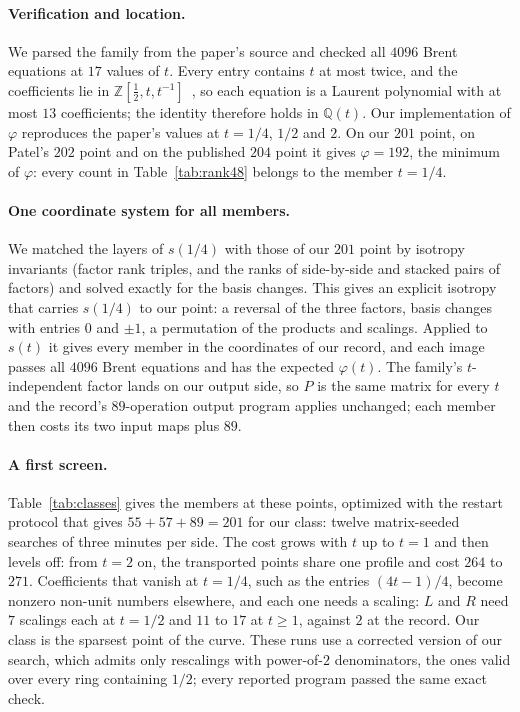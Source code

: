 \documentclass[11pt]{article}
\theoremstyle{remark}
\newcommand{\Q}{\mathbb{Q}}
\newcommand{\Z}{\mathbb{Z}}
\begin{document}
\paragraph{Verification and location.}  We parsed the family from the
paper's source and checked all $4096$ Brent equations at $17$ values of
$t$.  Every entry contains $t$ at most twice, and the coefficients lie in
$\Z[\frac12,t,t^{-1}]$~\cite{Agarwal26}, so each equation is a Laurent
polynomial with at most $13$ coefficients; the identity therefore holds
in $\Q(t)$.  Our implementation of $\varphi$ reproduces the paper's
values at $t=1/4$, $1/2$ and $2$.  On our $201$ point, on Patel's $202$
point and on the published $204$ point it gives $\varphi=192$, the
minimum of $\varphi$: every count in Table~\ref{tab:rank48} belongs to
the member $t=1/4$.

\paragraph{One coordinate system for all members.}  We matched the
layers of $s(1/4)$ with those of our $201$ point by isotropy invariants
(factor rank triples, and the ranks of side-by-side and stacked pairs of
factors) and solved exactly for the basis changes.  This gives an
explicit isotropy that carries $s(1/4)$ to our point: a reversal of the
three factors, basis changes with entries $0$ and $\pm1$, a permutation
of the products and scalings.  Applied to $s(t)$ it gives every member in
the coordinates of our record, and each image passes all $4096$ Brent
equations and has the expected $\varphi(t)$.  The family's
$t$-independent factor lands on our output side, so $P$ is the same
matrix for every $t$ and the record's $89$-operation output program
applies unchanged; each member then costs its two input maps plus $89$.

\paragraph{A first screen.}  Table~\ref{tab:classes} gives the members at
these points, optimized with the restart protocol that gives
$55+57+89=201$ for our class: twelve matrix-seeded searches of three
minutes per side.  The cost grows with $t$ up to $t=1$ and then levels
off: from $t=2$ on, the transported points share one profile and cost
$264$ to $271$.  Coefficients that vanish at $t=1/4$, such as the entries
$(4t-1)/4$, become nonzero non-unit numbers elsewhere, and each one needs
a scaling: $L$ and $R$ need $7$ scalings each at $t=1/2$ and $11$ to $17$
at $t\ge1$, against $2$ at the record.  Our class is the sparsest point of
the curve.  These runs use a corrected version of our search, which
admits only rescalings with power-of-$2$ denominators, the ones valid
over every ring containing $1/2$; every reported program passed the
same exact check.
\end{document}
